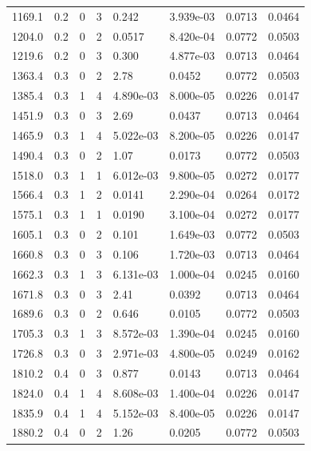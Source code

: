 \documentclass[preview]{standalone}
\begin{document}
{{{\begin{tabular}{L{1.2cm}C{1.2cm} C{0.3cm}C{0.5cm} C{1.4cm}C{1.4cm} C{1.4cm}C{1.4cm}}
  1169.1  &   0.2  & 0     &  3 &  0.242  & 3.939e-03  & 0.0713 &  0.0464   \\ 
  1204.0  &   0.2  & 0     &  2 &  0.0517  & 8.420e-04  & 0.0772 &  0.0503   \\ 
  1219.6  &   0.2  & 0     &  3 &  0.300  & 4.877e-03  & 0.0713 &  0.0464   \\ 
  1363.4  &   0.3  & 0     &  2 &  2.78  & 0.0452  & 0.0772 &  0.0503   \\ 
  1385.4  &   0.3  & 1     &  4 &  4.890e-03  & 8.000e-05  & 0.0226 &  0.0147   \\ 
  1451.9  &   0.3  & 0     &  3 &  2.69  & 0.0437  & 0.0713 &  0.0464   \\ 
  1465.9  &   0.3  & 1     &  4 &  5.022e-03  & 8.200e-05  & 0.0226 &  0.0147   \\ 
  1490.4  &   0.3  & 0     &  2 &  1.07  & 0.0173  & 0.0772 &  0.0503   \\ 
  1518.0  &   0.3  & 1     &  1 &  6.012e-03  & 9.800e-05  & 0.0272 &  0.0177   \\ 
  1566.4  &   0.3  & 1     &  2 &  0.0141  & 2.290e-04  & 0.0264 &  0.0172   \\ 
  1575.1  &   0.3  & 1     &  1 &  0.0190  & 3.100e-04  & 0.0272 &  0.0177   \\ 
  1605.1  &   0.3  & 0     &  2 &  0.101  & 1.649e-03  & 0.0772 &  0.0503   \\ 
  1660.8  &   0.3  & 0     &  3 &  0.106  & 1.720e-03  & 0.0713 &  0.0464   \\ 
  1662.3  &   0.3  & 1     &  3 &  6.131e-03  & 1.000e-04  & 0.0245 &  0.0160   \\ 
  1671.8  &   0.3  & 0     &  3 &  2.41  & 0.0392  & 0.0713 &  0.0464   \\ 
  1689.6  &   0.3  & 0     &  2 &  0.646  & 0.0105  & 0.0772 &  0.0503   \\ 
  1705.3  &   0.3  & 1     &  3 &  8.572e-03  & 1.390e-04  & 0.0245 &  0.0160   \\ 
  1726.8  &   0.3  & 0     &  3 &  2.971e-03  & 4.800e-05  & 0.0249 &  0.0162   \\ 
  1810.2  &   0.4  & 0     &  3 &  0.877  & 0.0143  & 0.0713 &  0.0464   \\ 
  1824.0  &   0.4  & 1     &  4 &  8.608e-03  & 1.400e-04  & 0.0226 &  0.0147   \\ 
  1835.9  &   0.4  & 1     &  4 &  5.152e-03  & 8.400e-05  & 0.0226 &  0.0147   \\ 
  1880.2  &   0.4  & 0     &  2 &  1.26  & 0.0205  & 0.0772 &  0.0503   \\ 

\end{tabular}}}}
\end{document}
